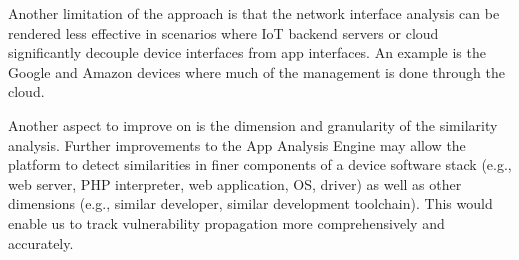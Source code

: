 Another limitation of the approach is that the network interface analysis can be rendered less effective in scenarios where IoT backend servers or cloud significantly decouple device interfaces from app interfaces. An example is the Google and Amazon devices where much of the management is done through the cloud.

Another aspect to improve on is the dimension and granularity of the similarity analysis. Further improvements to the App Analysis Engine may allow the platform to detect similarities in finer components of a device software stack (e.g., web server, PHP interpreter, web application, OS, driver) as well as other dimensions (e.g., similar developer, similar development toolchain). This would enable us to track vulnerability propagation more comprehensively and accurately. 
\newpage

